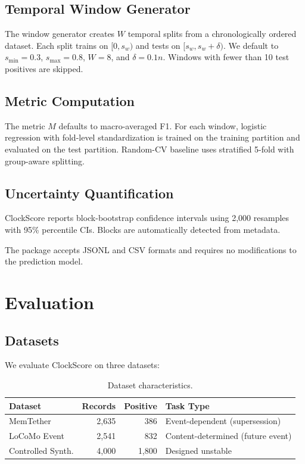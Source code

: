 \documentclass[sigconf,nonacm]{acmart}
\begin{document}
\subsection{Temporal Window Generator}
The window generator creates $W$ temporal splits from a chronologically ordered dataset. Each split trains on $[0, s_w)$ and tests on $[s_w, s_w + \delta)$. We default to $s_{\min} = 0.3$, $s_{\max} = 0.8$, $W = 8$, and $\delta = 0.1n$. Windows with fewer than 10 test positives are skipped.

\subsection{Metric Computation}
The metric $M$ defaults to macro-averaged F1. For each window, logistic regression with fold-level standardization is trained on the training partition and evaluated on the test partition. Random-CV baseline uses stratified 5-fold with group-aware splitting.

\subsection{Uncertainty Quantification}
ClockScore reports block-bootstrap confidence intervals using 2,000 resamples with 95\% percentile CIs. Blocks are automatically detected from metadata.

The package accepts JSONL and CSV formats and requires no modifications to the prediction model.

\section{Evaluation}

\subsection{Datasets}

We evaluate ClockScore on three datasets:

\begin{table}[h]
\centering
\caption{Dataset characteristics.}
\label{tab:datasets}
\begin{tabular}{lrrl}
\toprule
Dataset & Records & Positive & Task Type \\
\midrule
MemTether & 2,635 & 386 & Event-dependent (supersession) \\
LoCoMo Event & 2,541 & 832 & Content-determined (future event) \\
Controlled Synth. & 4,000 & 1,800 & Designed unstable \\
\bottomrule
\end{tabular}
\end{table}
\end{document}
